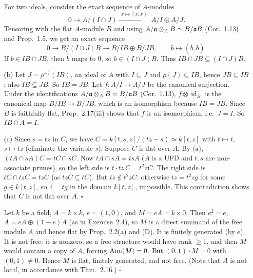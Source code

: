 \documentclass[11pt]{article}
\begin{document}
For two ideals, consider the exact sequence of $A$-modules
\[ 0\to A/(I\cap J)\xrightarrow{\ \ x\mapsto(x,x)\ \ }A/I\oplus A/J. \]
Tensoring with the flat $A$-module $B$ and using $A/\mathfrak a\otimes_AB\simeq B/\mathfrak a B$ (Cor.~1.13) and Prop.~1.5, we get an exact sequence
\[ 0\to B/(I\cap J)B\to B/IB\oplus B/JB,\qquad \bar b\mapsto(\bar b,\bar b). \]
If $b\in IB\cap JB$, then $\bar b$ maps to $0$, so $b\in(I\cap J)B$. Thus $IB\cap JB\subseteq(I\cap J)B$.

(b) Let $J=\rho^{-1}(IB)$, an ideal of $A$ with $I\subseteq J$ and $\rho(J)\subseteq IB$, hence $JB\subseteq IB$; also $IB\subseteq JB$. So $IB=JB$. Let $f:A/I\to A/J$ be the canonical surjection. Under the identifications $A/\mathfrak a\otimes_AB=B/\mathfrak a B$ (Cor.~1.13), $f\otimes\operatorname{id}_B$ is the canonical map $B/IB\to B/JB$, which is an isomorphism because $IB=JB$. Since $B$ is faithfully flat, Prop.~2.17(iii) shows that $f$ is an isomorphism, i.e.\ $J=I$. So $IB\cap A=I$.

(c) Since $s=tz$ in $C$, we have $C=k[t,s,z]/(tz-s)\simeq k[t,z]$ with $t\mapsto t$, $s\mapsto tz$ (eliminate the variable $s$). Suppose $C$ is flat over $A$. By (a), $(tA\cap sA)C=tC\cap sC$. Now $tA\cap sA=tsA$ ($A$ is a UFD and $t,s$ are non-associate primes), so the left side is $t\cdot tz\,C=t^2zC$. The right side is $tC\cap tzC=tzC$ (as $tzC\subseteq tC$). But $tz\notin t^2zC$: otherwise $tz=t^2zg$ for some $g\in k[t,z]$, so $1=tg$ in the domain $k[t,z]$, impossible. This contradiction shows that $C$ is not flat over $A$. \hfill$\square$

\pf
Let $k$ be a field, $A=k\times k$, $e=(1,0)$, and $M=eA=k\times 0$. Then $e^2=e$, $A=eA\oplus(1-e)A$ (as in Exercise~2.4), so $M$ is a direct summand of the free module $A$ and hence flat by Prop.~2.2(a) and (D). It is finitely generated (by $e$). It is not free: it is nonzero, so a free structure would have rank $\ge1$, and then $M$ would contain a copy of $A$, forcing $\operatorname{Ann}(M)=0$. But $(0,1)\cdot M=0$ with $(0,1)\ne0$. Hence $M$ is flat, finitely generated, and not free. (Note that $A$ is not local, in accordance with Thm.~2.16.) \hfill$\square$
\end{document}
